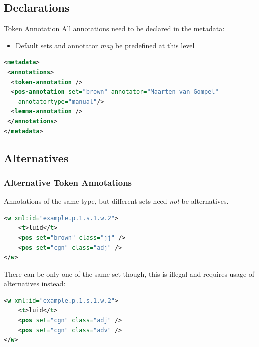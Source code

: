 \documentclass[compress,10pt]{beamer}
\begin{document}
        
\subsection{Declarations}

\begin{frame}[fragile]
    \begin{block}{Token Annotation}
        All annotations need to be declared in the metadata:
        \begin{itemize}
            \item Default sets and annotator \emph{may} be predefined at this level
        \end{itemize}
    \end{block}
    \begin{example}
\begin{lstlisting}[language=xml]
<metadata>
 <annotations>
  <token-annotation />
  <pos-annotation set="brown" annotator="Maarten van Gompel"
    annotatortype="manual"/>
  <lemma-annotation />
 </annotations>
</metadata>                     
\end{lstlisting}        
    \end{example}
\end{frame}

\subsection{Alternatives}

\begin{frame}[fragile]
\frametitle{Alternative Token Annotations}

Annotations of the same type, but different sets need \emph{not} be alternatives.

\begin{lstlisting}[language=xml]
<w xml:id="example.p.1.s.1.w.2">
    <t>luid</t>
    <pos set="brown" class="jj" />
    <pos set="cgn" class="adj" />
</w>                         
\end{lstlisting}        

There can be only one of the same set though, this is illegal and requires usage of alternatives instead:

\begin{lstlisting}[language=xml]
<w xml:id="example.p.1.s.1.w.2">
    <t>luid</t>
    <pos set="cgn" class="adj" />
    <pos set="cgn" class="adv" />
</w>                         
\end{lstlisting}   

\end{frame}
\end{document}
